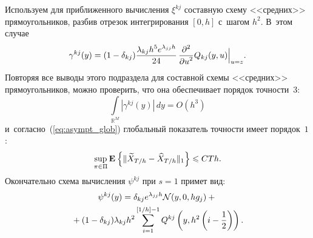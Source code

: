 \begin{multicols}{2}
 \begin{figure*} %
 \vspace*{1pt}
 \begin{minipage}[t]{80mm}
 \begin{center}
 \mbox{%
 \epsfxsize=79mm 
 }
 \end{center}
   \vspace*{-9pt}
 \label{pic:pic2}
\end{minipage}
\hfill
\vspace*{1pt}
\begin{minipage}[t]{80mm}
 \begin{center}
 \mbox{%
 \epsfxsize=79mm 
 }
 \end{center}
   \vspace*{-9pt}
 \label{pic:pic4}
\end{minipage}
\end{figure*}

Используем для приближенного вычисления $\xi^{kj}$ составную схему 
<<средних>> прямоугольников, разбив отрезок интегрирования $[0,h]$ 
с~шагом $h^2$. В~этом случае
 \begin{equation*} %
 \gamma^{kj}(y)=(1-\delta_{kj})\fr{\lambda_{kj}h^5e^{\lambda_{jj}h}}{24}
\,\fr{\partial^2}{\partial u^2}Q_{kj}(y,u)\Bigl|_{u=z}.
 \end{equation*}
 Повторяя все выводы этого подраздела для составной схемы <<средних>> 
прямоугольников, можно проверить, что она обеспечивает порядок 
точ\-ности~$3$:
 $$
 \int\limits_{\mathbb{R}^M}|\gamma^{kj}(y)|\,dy = O(h^3)
 $$ 
и~согласно~(\ref{eq:asympt_glob}) глобальный показатель точности имеет 
порядок~$1$:
 $$
\sup\limits_{\pi \in \Pi}\mathbf{E}_{  }\left\{ \mathop{\|\widetilde{X}_{T/h} - 
\widehat{X}_{T/h}\|_1} \right\} \leqslant CTh.
$$
 Окончательно схема вычисления $\psi^{kj}$ при $s=1$ примет вид:
 \begin{multline*} %
 \psi^{kj}(y)=\delta_{kj}e^{\lambda_{jj}h}\mathcal{N}(y,0,hg_j)
+{}\\
{}+
 (1-\delta_{kj})\lambda_{kj}h^2 
\sum\limits_{i=1}^{\left[{1}/{h}\right]-1} 
Q^{kj}\left(y,h^2\left(i-\fr{1}{2}\right)\right).
 \end{multline*}
 

\end{multicols}
